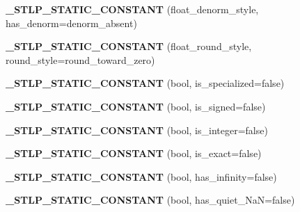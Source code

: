 \begin{DoxyCompactItemize}
{\bfseries \+\_\+\+S\+T\+L\+P\+\_\+\+S\+T\+A\+T\+I\+C\+\_\+\+C\+O\+N\+S\+T\+A\+NT} (float\+\_\+denorm\+\_\+style, has\+\_\+denorm=denorm\+\_\+absent)
\item 
\mbox{\label{class___numeric__limits__base_ada47dd654185c50da03e9c6f3226eaf6}} 
{\bfseries \+\_\+\+S\+T\+L\+P\+\_\+\+S\+T\+A\+T\+I\+C\+\_\+\+C\+O\+N\+S\+T\+A\+NT} (float\+\_\+round\+\_\+style, round\+\_\+style=round\+\_\+toward\+\_\+zero)
\item 
\mbox{\label{class___numeric__limits__base_a686376c4ed8b1b2f5adbad01434dcf34}} 
{\bfseries \+\_\+\+S\+T\+L\+P\+\_\+\+S\+T\+A\+T\+I\+C\+\_\+\+C\+O\+N\+S\+T\+A\+NT} (bool, is\+\_\+specialized=false)
\item 
\mbox{\label{class___numeric__limits__base_a17f28233e0e6c086d60ade863a743832}} 
{\bfseries \+\_\+\+S\+T\+L\+P\+\_\+\+S\+T\+A\+T\+I\+C\+\_\+\+C\+O\+N\+S\+T\+A\+NT} (bool, is\+\_\+signed=false)
\item 
\mbox{\label{class___numeric__limits__base_a7cbb11e07ceb7a646267067b1dd65014}} 
{\bfseries \+\_\+\+S\+T\+L\+P\+\_\+\+S\+T\+A\+T\+I\+C\+\_\+\+C\+O\+N\+S\+T\+A\+NT} (bool, is\+\_\+integer=false)
\item 
\mbox{\label{class___numeric__limits__base_ae7a859c47cf67b88cb37dbde3ae1971b}} 
{\bfseries \+\_\+\+S\+T\+L\+P\+\_\+\+S\+T\+A\+T\+I\+C\+\_\+\+C\+O\+N\+S\+T\+A\+NT} (bool, is\+\_\+exact=false)
\item 
\mbox{\label{class___numeric__limits__base_a443e0d9f5dd08c1648e31129dd30691a}} 
{\bfseries \+\_\+\+S\+T\+L\+P\+\_\+\+S\+T\+A\+T\+I\+C\+\_\+\+C\+O\+N\+S\+T\+A\+NT} (bool, has\+\_\+infinity=false)
\item 
\mbox{\label{class___numeric__limits__base_aacc8f16525692a9dec4c465e7fab79c0}} 
{\bfseries \+\_\+\+S\+T\+L\+P\+\_\+\+S\+T\+A\+T\+I\+C\+\_\+\+C\+O\+N\+S\+T\+A\+NT} (bool, has\+\_\+quiet\+\_\+\+NaN=false)
\item 
\mbox{\label{class___numeric__limits__base_a7fa4e3427889e39fbf0c13dcf713b354}} 

\end{DoxyCompactItemize}
